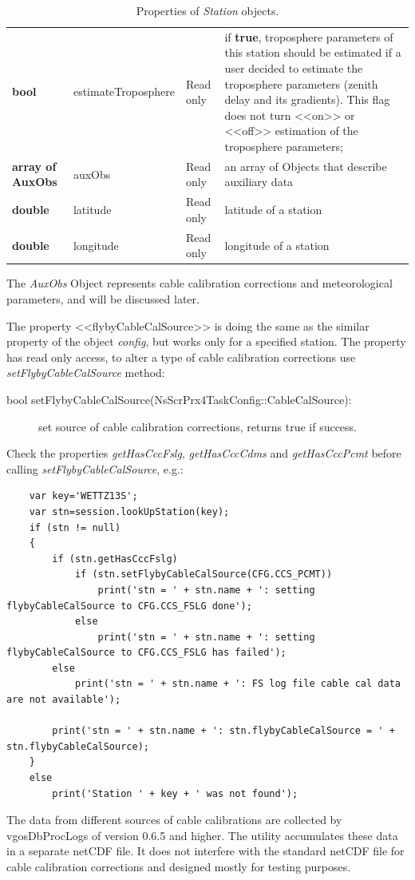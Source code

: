 \documentclass [10pt,letterpaper]{report}
\begin{document}
\begin{table}[htb]
\begin{tabular}{lllp{}}
  {\bf bool}    & estimateTroposphere
                                    & Read only & if {\bf true}, troposphere parameters of this station should be
                                      estimated if a user decided to estimate the troposphere parameters (zenith delay
                                      and its gradients). This flag does not turn <<on>> or <<off>> estimation of the
                                      troposphere parameters;\\
  {\bf array of AuxObs} & auxObs    & Read only & an array of Objects that describe auxiliary data\\
  {\bf double}  & latitude          & Read only & latitude of a station\\
  {\bf double}  & longitude         & Read only & longitude of a station\\
\hline
\end{tabular}
\caption{Properties of {\sl Station} objects.}
\label{tab-scr-session-station}
\end{table}
\noindent
The {\sl AuxObs} Object represents cable calibration corrections and meteorological parameters, and
will be discussed later.

The property <<flybyCableCalSource>> is doing the same as the similar property of the object {\sl config},
but works only for a specified station. The property has read only access, to alter a type of cable
calibration corrections use {\sl setFlybyCableCalSource} method:
\noindent
\begin{description}
\item[bool setFlybyCableCalSource(NsScrPrx4TaskConfig::CableCalSource):] set source of cable calibration
corrections, returns true if success.
\end{description}
\noindent
Check the properties {\sl getHasCccFslg}, {\sl getHasCccCdms} and {\sl getHasCccPcmt} before calling 
{\sl setFlybyCableCalSource}, e.g.:

{\small\begin{verbatim}
    var key='WETTZ13S';
    var stn=session.lookUpStation(key);
    if (stn != null)
    {
        if (stn.getHasCccFslg)
            if (stn.setFlybyCableCalSource(CFG.CCS_PCMT))
                print('stn = ' + stn.name + ': setting flybyCableCalSource to CFG.CCS_FSLG done');
            else
                print('stn = ' + stn.name + ': setting flybyCableCalSource to CFG.CCS_FSLG has failed');
        else
            print('stn = ' + stn.name + ': FS log file cable cal data are not available');

        print('stn = ' + stn.name + ': stn.flybyCableCalSource = ' + stn.flybyCableCalSource);
    }
    else
        print('Station ' + key + ' was not found');
\end{verbatim}}
\noindent
The data from different sources of cable calibrations are collected by vgosDbProcLogs of version 0.6.5 and higher.
The utility accumulates these data in a separate netCDF file. It does not interfere with the standard netCDF
file for cable calibration corrections and designed mostly for testing purposes.
\end{document}
